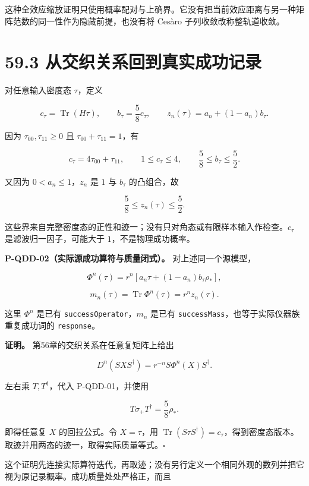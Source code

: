 \documentclass[
  11pt,
  oneside]{book}
\begin{document}
这种全效应缩放证明只使用概率配对与上确界。它没有把当前效应距离与另一种矩阵范数的同一性作为隐藏前提，也没有将
Cesàro 子列收敛改称整轨道收敛。

\hypertarget{ux4eceux4ea4ux7ec7ux5173ux7cfbux56deux5230ux771fux5b9eux6210ux529fux8bb0ux5f55}{%
\section{59.3
从交织关系回到真实成功记录}\label{ux4eceux4ea4ux7ec7ux5173ux7cfbux56deux5230ux771fux5b9eux6210ux529fux8bb0ux5f55}}

对任意输入密度态 \(\tau\)，定义

\[
c_\tau=\operatorname{Tr}(H\tau),\qquad
b_\tau=\frac58c_\tau,\qquad
z_n(\tau)=a_n+(1-a_n)b_\tau.
\]

因为 \(\tau_{00},\tau_{11}\ge0\) 且 \(\tau_{00}+\tau_{11}=1\)，有

\[
c_\tau=4\tau_{00}+\tau_{11},\qquad
1\le c_\tau\le4,\qquad
\frac58\le b_\tau\le\frac52.
\]

又因为 \(0<a_n\le1\)，\(z_n\) 是 \(1\) 与 \(b_\tau\) 的凸组合，故

\[
\frac58\le z_n(\tau)\le\frac52.
\]

这些界来自完整密度态的正性和迹一；没有只对角态或有限样本输入作检查。\(c_\tau\)
是滤波归一因子，可能大于 \(1\)，不是物理成功概率。

\protect\hypertarget{p-qdd-02}{}{}

\textbf{P-QDD-02（实际源成功算符与质量闭式）。} 对上述同一个源模型，

\[
\Phi^n(\tau)
=r^n\left[a_n\tau+(1-a_n)b_\tau\rho_*\right],
\]

\[
m_n(\tau)=\operatorname{Tr}\Phi^n(\tau)
=r^nz_n(\tau).
\]

这里 \(\Phi^n\) 是已有 \texttt{successOperator}，\(m_n\) 是已有
\texttt{successMass}，也等于实际仪器族重复成功词的 \texttt{response}。

\textbf{证明。} 第56章的交织关系在任意复矩阵上给出

\[
D^n(SXS^\dagger)=r^{-n}S\Phi^n(X)S^\dagger.
\]

左右乘 \(T,T^\dagger\)，代入 P-QDD-01，并使用

\[
T\sigma_+T^\dagger=\frac58\rho_*.
\]

即得任意复 \(X\) 的回拉公式。令 \(X=\tau\)，用
\(\operatorname{Tr}(S\tau S^\dagger)=c_\tau\)，得到密度态版本。取迹并用两态的迹一，取得实际质量等式。\(\square\)

这个证明先连接实际算符迭代，再取迹；没有另行定义一个相同外观的数列并把它视为原记录概率。成功质量处处严格正，而且
\end{document}
